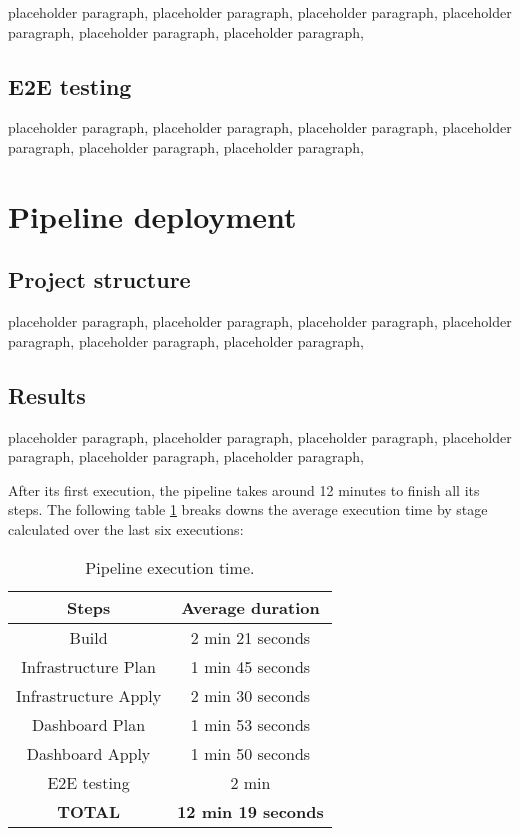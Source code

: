 placeholder paragraph, placeholder paragraph, placeholder paragraph, placeholder paragraph, placeholder paragraph, placeholder paragraph,

\subsection{E2E testing}

placeholder paragraph, placeholder paragraph, placeholder paragraph, placeholder paragraph, placeholder paragraph, placeholder paragraph,

\section{Pipeline deployment}

\subsection{Project structure}

\quad placeholder paragraph, placeholder paragraph, placeholder paragraph, placeholder paragraph, placeholder paragraph, placeholder paragraph,

\subsection{Results}

placeholder paragraph, placeholder paragraph, placeholder paragraph, placeholder paragraph, placeholder paragraph, placeholder paragraph,



After its first execution, the pipeline takes around 12 minutes to finish all its steps. The following table \ref{tab:execution-time} breaks downs the average execution time by stage calculated over the last six executions:  \\

\begin{table}[!h]
\centering
\begin{tabular}{|c|c|}
\hline
\rowcolor[HTML]{DAE8FC} 
Steps                & Average duration           \\ \hline
\rowcolor[HTML]{EFEFEF} 
Build                & 2 min 21 seconds           \\ \hline
\rowcolor[HTML]{EFEFEF} 
Infrastructure Plan  & 1 min 45 seconds           \\ \hline
\rowcolor[HTML]{EFEFEF} 
Infrastructure Apply & 2 min 30 seconds           \\ \hline
\rowcolor[HTML]{EFEFEF} 
Dashboard Plan       & 1 min 53 seconds           \\ \hline
\rowcolor[HTML]{EFEFEF} 
Dashboard Apply      & 1 min 50 seconds           \\ \hline
\rowcolor[HTML]{EFEFEF} 
E2E testing          & 2 min                      \\ \hline
\rowcolor[HTML]{9B9B9B} 
\textbf{TOTAL}       & \textbf{12 min 19 seconds} \\ \hline
\end{tabular}
\caption{Pipeline execution time.}
\label{tab:execution-time}
\end{table}


